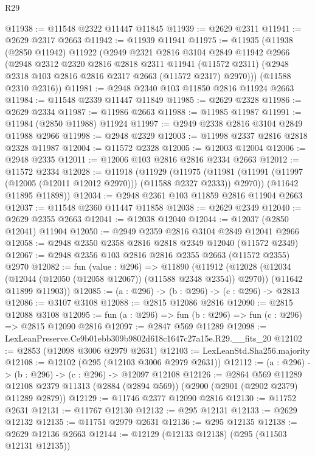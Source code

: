 \begin{lexlean}{R29}
\begin{coremodule}
@11938 := @11548 @2322 @11447 @11845
@11939 := @2629 @2311
@11941 := @2629 @2317 @2663
@11942 := @11939 @11941
@11975 := @11935
    (@11938
      (@2850 @11942)
      @11922
      (@2949
        @2321
        @2816
        @3104
        @2849
        @11942
        @2966
        (@2948
          @2312
          @2320
          @2816
          @2818
          @2311
          @11941
          (@11572 @2311)
          (@2948 @2318 @103 @2816 @2816 @2317 @2663 (@11572 @2317) @2970)))
      (@11588 @2310 @2316))
@11981 := @2948 @2340 @103 @11850 @2816 @11924 @2663
@11984 := @11548 @2339 @11447 @11849
@11985 := @2629 @2328
@11986 := @2629 @2334
@11987 := @11986 @2663
@11988 := @11985 @11987
@11991 := @11984 (@2850 @11988) @11924
@11997 := @2949 @2338 @2816 @3104 @2849 @11988 @2966
@11998 := @2948 @2329
@12003 := @11998 @2337 @2816 @2818 @2328 @11987
@12004 := @11572 @2328
@12005 := @12003 @12004
@12006 := @2948 @2335
@12011 := @12006 @103 @2816 @2816 @2334 @2663
@12012 := @11572 @2334
@12028 := @11918
    (@11929
      (@11975 (@11981 (@11991 (@11997 (@12005 (@12011 @12012 @2970))) (@11588 @2327 @2333)) @2970))
      (@11642 @11895 @11898))
@12034 := @2948 @2361 @103 @11859 @2816 @11904 @2663
@12037 := @11548 @2360 @11447 @11858
@12038 := @2629 @2349
@12040 := @2629 @2355 @2663
@12041 := @12038 @12040
@12044 := @12037 (@2850 @12041) @11904
@12050 := @2949 @2359 @2816 @3104 @2849 @12041 @2966
@12058 := @2948 @2350 @2358 @2816 @2818 @2349 @12040 (@11572 @2349)
@12067 := @2948 @2356 @103 @2816 @2816 @2355 @2663 (@11572 @2355) @2970
@12082 := fun (value : @296) =>
  @11890
    (@11912
      (@12028 (@12034 (@12044 (@12050 (@12058 @12067)) (@11588 @2348 @2354)) @2970))
      (@11642 @11899 @11903))
@12085 := (a : @296) -> (b : @296) -> (c : @296) -> @2813
@12086 := @3107 @3108
@12088 := @2815 @12086 @2816
@12090 := @2815 @12088 @3108
@12095 := fun (a : @296) => fun (b : @296) => fun (c : @296) => @2815 @12090 @2816
@12097 := @2847 @569 @11289
@12098 := LexLeanPreserve.Ce9b01ebb309b9802d618c1647c27a15e.R29.__fits_20
@12102 := @2853 (@12098 @3006 @2979 @2631)
@12103 := LexLeanStd.Sha256.majority
@12108 := @12102 (@295 (@12103 @3006 @2979 @2631))
@12112 := (a : @296) -> (b : @296) -> (c : @296) -> @12097 @12108
@12126 := @2864
    @569
    @11289
    @12108
    @2379
    @11313
    (@2884 (@2894 @569))
    (@2900 (@2901 (@2902 @2379) @11289 @2879))
@12129 := @11746 @2377 @12090 @2816
@12130 := @11752 @2631
@12131 := @11767 @12130
@12132 := @295 @12131
@12133 := @2629 @12132
@12135 := @11751 @2979 @2631
@12136 := @295 @12135
@12138 := @2629 @12136 @2663
@12144 := @12129 (@12133 @12138) (@295 (@11503 @12131 @12135))

\end{coremodule}
\end{lexlean}
